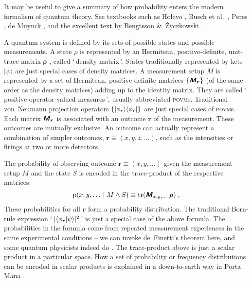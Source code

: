 \documentclass[\ifafour a4paper,12pt,\else a5paper,10pt,\fi%
onecolumn,oneside,article,%
british%
]{memoir}
\newcommand*{\defquote}[1]{`\,#1\,'}
\theoremstyle{remark}
\theoremstyle{innote}
\newcommand*{\mathte}[1]{\textbf{\textit{\textsf{#1}}}}
\newcommand*{\citep}{\parencites}%
\newcommand*{\citey}{\parencites*}
\newcommand*{\amp}{\&}
\DeclareMathOperator{\tr}{tr}%
\DeclarePairedDelimiter\abs{\lvert}{\rvert}
\DeclarePairedDelimiter\set{\{}{\}}
\newcommand*{\pf}{\mathrm{p}}%
\renewcommand*{\|}[1][]{\nonscript\,#1\vert\nonscript\;\mathopen{}}
\newcommand*{\chap}{ch.}%
\newcommand*{\etal}{{et al.}}
\newcommand*{\yr}{\bm{\rho}}
\newcommand*{\yM}{\mathte{M}}
\newcommand*{\povm}{\textsc{povm}}
\newcommand*{\ybr}{\bm{r}}
\begin{document}
It may be useful to give a summary of how probability enters the modern
formalism of quantum theory. See textbooks such as Holevo
\citey{holevo1980_t2011}, Busch \etal\ \citey{buschetal1995b}, Peres
\citey[especially \chap~12]{peres1995}, de Muynck \citey[especially
\chap~3]{demuynck2002b}, and the excellent text by Bengtsson \amp\
\.Zyczkowski \citey{bengtssonetal2006_r2017}.

A quantum system is defined by its sets of possible states and possible
measurements. A state $\rho$ is represented by an Hermitean,
positive-definite, unit-trace matrix $\yr$ \citep[which satisfies
additional mathematical
properties:][]{jakobczyketal2001,kimura2003,kimuraetal2004,bengtssonetal2006_r2017},
called \defquote{density matrix}. States traditionally represented by kets
$\lvert \psi \rangle$ are just special cases of density matrices. A
measurement setup $M$ is represented by a set of Hermitean,
positive-definite matrices $\set{\yM_{\ybr}}$ (of the same order as the
density matrices) adding up to the identity matrix. They are called
\defquote{positive-operator-valued measures}, usually abbreviated \povm s.
Traditional von~Neumann projection operators
$\set{\lvert \phi_{r} \rangle\langle \phi_{r}\rvert}$ are just special
cases of \povm s. Each matrix $\yM_{\ybr}$ is associated with an outcome
$\ybr$ of the measurement. These outcomes are mutually exclusive. An
outcome can actually represent a combination of simpler outcomes,
$\ybr\equiv(x,y,z,\dotsc)$, such as the intensities or firings at two or
more detectors.

The probability of observing outcome $\ybr\equiv (x, y, \dotsc)$ given
the measurement setup $M$ and the state $S$ is encoded in the trace-product
of the respective matrices:
\begin{equation}
  \label{eq:povm_trace}
  \pf(x,y,\dotsc \| M \land S) \equiv \tr(\yM_{x,y,\dotsc}\;\yr) \;,
\end{equation}
These probabilities for all $\ybr$ form a probability distribution. The
traditional Born-rule expression
\defquote{$\abs{\langle \phi_{r} \vert \psi \rangle}^{2}$} is just a
special case of the above formula. The probabilities in the formula come
from repeated measurement experiences in the same experimental conditions
-- we can invoke de~Finetti's theorem here, and some quantum physicists
indeed do \citep{cavesetal2002,vanenketal2002,fuchsetal2004b}. The
trace-product above is just a scalar product in a particular space. How a
set of probability or frequency distributions can be encoded in scalar
products is explained in a down-to-earth way in Porta Mana
\citey{portamana2003b}.
\end{document}
